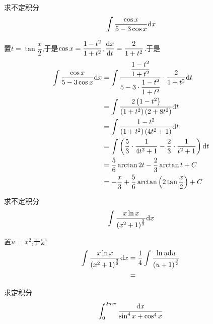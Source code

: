 \documentclass{ctexart}
\begin{document}
\begin{problem}[Problem 9.]
    求不定积分$$\int\dfrac{\cos x}{5-3\cos x}\mathrm{d} x$$
\end{problem}
\begin{solution}[Solution.]
    置$t=\tan{\dfrac{x}{2}}$,于是$\cos x=\dfrac{1-t^2}{1+t^2},\dfrac{\mathrm{d} x}{\mathrm{d} t}=\dfrac{2}{1+t^2}$.于是
    $$\begin{aligned}
        \int\dfrac{\cos x}{5-3\cos x}\mathrm{d} x
        &= \int\dfrac{\dfrac{1-t^2}{1+t^2}}{5-3\cdot\dfrac{1-t^2}{1+t^2}}\cdot\dfrac{2}{1+t^2}\mathrm{d} t \\
        &= \int\dfrac{2\left(1-t^2\right)}{\left(1+t^2\right)\left(2+8t^2\right)}\mathrm{d} t \\
        &= \int\dfrac{1-t^2}{\left(1+t^2\right)\left(4t^2+1\right)}\mathrm{d} t \\
        &= \int\left(\dfrac{5}{3}\cdot\dfrac{1}{4t^2+1}-\dfrac{2}{3}\cdot\dfrac{1}{t^2+1}\right)\mathrm{d} t \\
        &= \dfrac{5}{6}\arctan 2t-\dfrac{2}{3}\arctan t+C \\
        &= -\dfrac{x}{3}+\dfrac{5}{6}\arctan\left(2\tan\dfrac{x}{2}\right)+C
    \end{aligned}$$
\end{solution}
\begin{problem}[Problem 10.]
    求不定积分$$\int\dfrac{x\ln x}{\left(x^2+1\right)^{\frac{3}{2}}}\mathrm{d} x$$
\end{problem}
\begin{solution}[Solution.]
    置$u=x^2$,于是
    $$\begin{aligned}
        \int\dfrac{x\ln x}{\left(x^2+1\right)^{\frac{3}{2}}}\mathrm{d} x
        &= \dfrac{1}{4}\int\dfrac{\ln u\mathrm{d} u}{\left(u+1\right)^{\frac{3}{2}}} \\
        &= 
    \end{aligned}$$
\end{solution}
\begin{problem}[Problem 11.]
    求定积分$$\int_0^{2m\pi}\dfrac{\mathrm{d} x}{\sin^4x+\cos^4x}$$
\end{problem}
\end{document}
